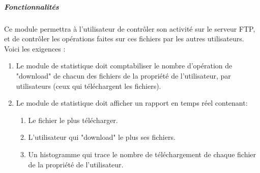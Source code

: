 \documentclass[10pt,a4paper]{report}
\begin{document}
	\subparagraph{Fonctionnalités}

	Ce module permettra à l'utilisateur de contrôler son activité sur le serveur FTP, et de contrôler les opérations faites sur ces fichiers par les autres utilisateurs.\\

	Voici les exigences :
		\begin{enumerate}

			\item Le module de statistique doit comptabiliser le nombre d'opération de "download" de chacun des fichiers de la propriété de l'utilisateur, par utilisateurs (ceux qui téléchargent les fichiers).

			\item Le module de statistique doit afficher un rapport en temps réel contenant: 

			\begin{enumerate}
				\item Le fichier le plus télécharger.

				\item L'utilisateur qui "download" le plus ses fichiers.

				\item Un histogramme qui trace le nombre de téléchargement de chaque fichier de la propriété de l'utilisateur.
			\end{enumerate} 
		\end{enumerate}
\end{document}
